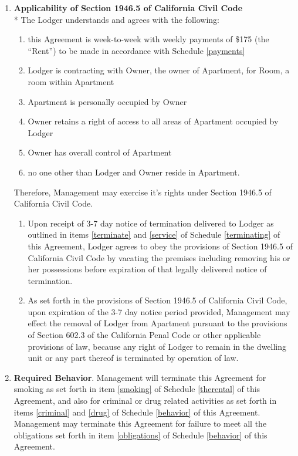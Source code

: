 \documentclass[12pt,letterpaper]{article}
\newcommand{\behavior}{Required Behavior}
\newcommand{\management}{Management}
\newcommand{\apt}{Apartment}
\newcommand{\room}{Room}
\newcommand{\rent}{\$175}
\begin{document}
	\begin{enumerate}
		\item \textbf{Applicability of Section 1946.5 of California Civil Code}\\*
			The Lodger understands and agrees with the following:
			\begin{enumerate}
				\item this Agreement is week-to-week with weekly payments of \rent{} (the ``Rent'') to be made in accordance with Schedule \ref{payments}
				\item Lodger is contracting with Owner, the owner of \apt{}, for \room{}, a room within \apt{}
				\item \apt{} is personally occupied by Owner
				\item Owner retains a right of access to all areas of \apt{} occupied by Lodger 
				\item Owner has overall control of \apt{} 
				\item no one other than Lodger and Owner reside in \apt{}. 
			\end{enumerate}
			Therefore, \management{} may exercise it's rights under Section 1946.5 of California Civil Code.
			\begin{enumerate}
				\item Upon receipt of 3-7 day notice of termination delivered to Lodger as outlined in items \ref{terminate} and \ref{service} of Schedule \ref{terminating} of this Agreement, Lodger agrees to obey the provisions of Section 1946.5 of California Civil Code by vacating the premises including removing his or her possessions before expiration of that legally delivered notice of termination.
				\item As set forth in the provisions of Section 1946.5 of California Civil Code, upon expiration of the 3-7 day notice period provided, \management{} may effect the removal of Lodger from \apt{} pursuant to the provisions of Section 602.3 of the California Penal Code or other applicable provisions of law, because any right of Lodger to remain in the dwelling unit or any part thereof is terminated by operation of law.
			\end{enumerate} 

		\item \textbf{\behavior{}}.
			\management{} will terminate this Agreement for smoking as set forth in item \ref{smoking} of Schedule \ref{therental} of this Agreement, and also for criminal or drug related activities as set forth in items \ref{criminal} and \ref{drug} of Schedule \ref{behavior} of this Agreement. \management{} may terminate this Agreement for failure to meet all the obligations set forth in item \ref{obligations} of Schedule \ref{behavior} of this Agreement.
	

\end{enumerate}
\end{document}
